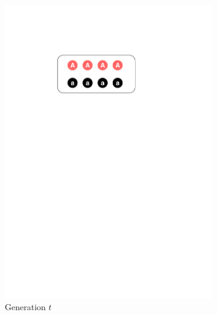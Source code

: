\documentclass[conference]{IEEEtran}
\begin{document}
\begin{figure}[htbp]
	\centering
	\begin{subfigure}[b]{.24\textwidth}
		\includegraphics[width=\linewidth]{Section2/Generation_t}
		\caption{Generation $t$}
	\end{subfigure}
	\begin{subfigure}[b]{.24\textwidth}

\end{subfigure}
\end{figure}
\end{document}
